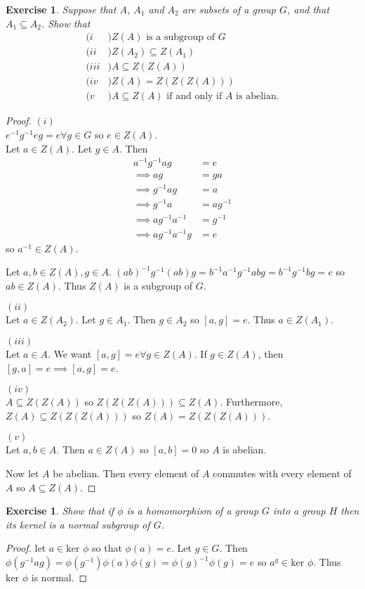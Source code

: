\documentclass{article}
\newtheorem{exercise}[theorem]{Exercise}
\begin{document}
\begin{exercise}
Suppose that $A$, $A_1$ and $A_2$ are subsets of a group $G$, and that $A_1\subseteq A_2$.
Show that\\
\begin{align*}
(i&) Z(A)\text{ is a subgroup of }G\\
(ii&) Z(A_2)\subseteq Z(A_1)\\
(iii&) A\subseteq Z(Z(A))\\
(iv&) Z(A)=Z(Z(Z(A)))\\
(v&) A\subseteq Z(A)\text{ if and only if }A\text{ is abelian.}
\end{align*}
\end{exercise}

\begin{proof}
$(i)$\\
$e^{-1}g^{-1}eg=e\forall g\in G$ so $e\in Z(A)$.\\
Let $a\in Z(A)$. Let $g\in A$. Then 
\begin{align*}   
a^{-1}g^{-1}ag&=e\\\implies ag&=ga\\\implies g^{-1}ag&=a\\\implies g^{-1}a&=ag^{-1}\\\implies ag^{-1}a^{-1}&=g^{-1}\\\implies ag^{-1}a^{-1}g&=e
\end{align*}
so $a^{-1}\in Z(A)$.

Let $a,b\in Z(A),g\in A.$ $(ab)^{-1}g^{-1}(ab)g=b^{-1}a^{-1}g^{-1}abg=b^{-1}g^{-1}bg=e$ so $ab\in Z(A)$.
Thus $Z(A)$ is a subgroup of $G$.

$(ii)$\\
Let $a\in Z(A_2)$. Let $g\in A_1$. Then $g\in A_2$ so $[a,g]=e$. Thus $a\in Z(A_1)$.

$(iii)$\\
Let $a\in A$. We want $[a,g]=e\forall g\in Z(A)$. If $g\in Z(A)$, then $[g,a]=e\implies [a,g]=e$.

$(iv)$\\
$A\subseteq Z(Z(A))$ so $Z(Z(Z(A)))\subseteq Z(A)$. Furthermore, $Z(A)\subseteq Z(Z(Z(A)))$ so $Z(A)=Z(Z(Z(A)))$.

$(v)$\\
Let $a,b\in A$. Then $a\in Z(A)$ so $[a,b]=0$ so $A$ is abelian.

Now let $A$ be abelian. Then every element of $A$ commutes with every element of $A$ so $A\subseteq Z(A)$.
\end{proof}

\begin{exercise}
Show that if $\phi$ is a homomorphism of a group $G$ into a group $H$ then its kernel is a normal subgroup of $G$.
\end{exercise}
\begin{proof}
let $a\in\text{ker }\phi$ so that $\phi(a)=e$. Let $g\in G$. Then $\phi(g^{-1}ag)=\phi(g^{-1})\phi(a)\phi(g)=\phi(g)^{-1}\phi(g)=e$ so $a^g\in \text{ker }\phi$. Thus $\text{ker }\phi$ is normal.
\end{proof}
\end{document}
